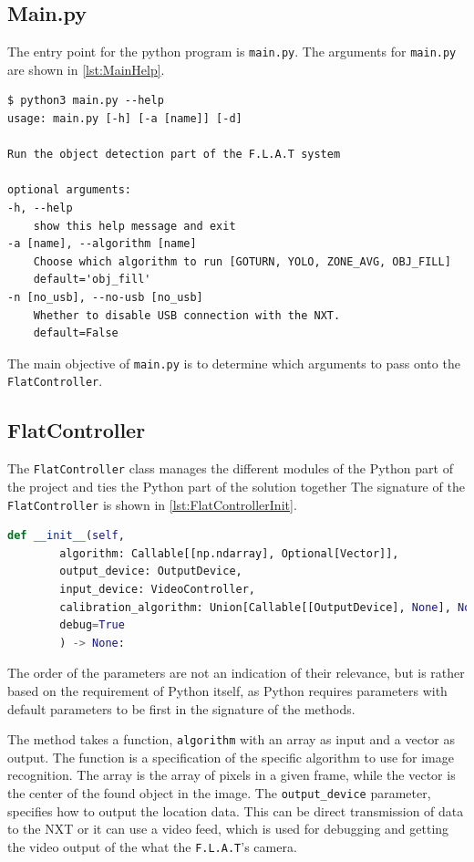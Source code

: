 \subsection{Main.py}
The entry point for the python program is \texttt{main.py}.
The arguments for \texttt{main.py}  are shown in \autoref{lst:MainHelp}.
\begin{lstlisting}[label={lst:MainHelp},caption={The help message of the commandline interface}]
$ python3 main.py --help
usage: main.py [-h] [-a [name]] [-d]

Run the object detection part of the F.L.A.T system

optional arguments:
-h, --help            
	show this help message and exit
-a [name], --algorithm [name] 
	Choose which algorithm to run [GOTURN, YOLO, ZONE_AVG, OBJ_FILL]
	default='obj_fill'
-n [no_usb], --no-usb [no_usb]
	Whether to disable USB connection with the NXT.
	default=False
\end{lstlisting}

The main objective of \texttt{main.py} is to determine which arguments to pass onto the \texttt{FlatController}.

\subsection{FlatController}\label{flatcontrollerimplementation}
The \texttt{FlatController} class manages the different modules of the Python part of the project and ties the Python part of the solution together
The signature of the \texttt{FlatController} is shown in \autoref{lst:FlatControllerInit}.

\begin{lstlisting}[language=Python,label={lst:FlatControllerInit},caption={Initialization method of the \texttt{FlatController} class}]
	def __init__(self,
		algorithm: Callable[[np.ndarray], Optional[Vector]],
		output_device: OutputDevice,
		input_device: VideoController,
		calibration_algorithm: Union[Callable[[OutputDevice], None], None] = None,
		debug=True
		) -> None:
\end{lstlisting}

The order of the parameters are not an indication of their relevance, but is rather based on the requirement of Python itself, as Python requires parameters with default parameters to be first in the signature of the methods.

The method takes a function, \texttt{algorithm} with an array as input and a vector as output.
The function is a specification of the specific algorithm to use for image recognition.
The array is the array of pixels in a given frame, while the vector is the center of the found object in the image.
The \texttt{output\_device} parameter, specifies how to output the location data.
This can be direct transmission of data to the NXT or it can use a video feed, which is used for debugging and getting the video output of the what the \texttt{F.L.A.T}'s camera.

